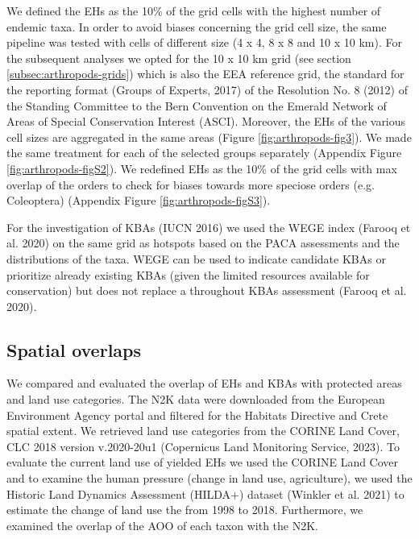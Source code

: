 We defined the EHs as the 10\% of the grid cells with the highest number of
endemic taxa. In order to avoid biases concerning the grid cell size, the same
pipeline was tested with cells of different size (4 x 4, 8 x 8 and 10 x 10 km).
For the subsequent analyses we opted for the 10 x 10 km grid (see section \ref{subsec:arthropods-grids})
which is also the EEA reference grid, the standard for the reporting format
(Groups of Experts, 2017) of the Resolution No. 8 (2012) of the Standing Committee
to the Bern Convention on the Emerald Network of Areas of Special Conservation Interest (ASCI).
Moreover, the EHs of the various cell sizes are aggregated in the same areas (Figure \ref{fig:arthropods-fig3}).
We made the same treatment for each of the selected groups separately (Appendix Figure \ref{fig:arthropods-figS2}).
We redefined EHs as the 10\% of the grid cells with max overlap of the orders
to check for biases towards more speciose orders (e.g. Coleoptera) (Appendix Figure \ref{fig:arthropods-figS3}).

For the investigation of KBAs (IUCN 2016) we used the WEGE index (Farooq et al. 2020)
on the same grid as hotspots based on the PACA assessments and the distributions
of the taxa. WEGE can be used to indicate candidate KBAs or prioritize already
existing KBAs (given the limited resources available for conservation) but does
not replace a throughout KBAs assessment (Farooq et al. 2020).

    \subsection{Spatial overlaps}
    \label{subsec:arthropods-spatial}
We compared and evaluated the overlap of EHs and KBAs with protected areas and
land use categories. The N2K data were downloaded from the European Environment
Agency portal and filtered for the Habitats Directive and Crete spatial extent.
We retrieved land use categories from the CORINE Land Cover, CLC 2018 version
v.2020-20u1 (Copernicus Land Monitoring Service, 2023).
To evaluate the current land use of yielded EHs we used the CORINE Land Cover
and to examine the human pressure (change in land use, agriculture), we used the
Historic Land Dynamics Assessment (HILDA+) dataset (Winkler et al. 2021) to
estimate the change of land use the from 1998 to 2018. Furthermore, we examined
the overlap of the AOO of each taxon with the N2K.


